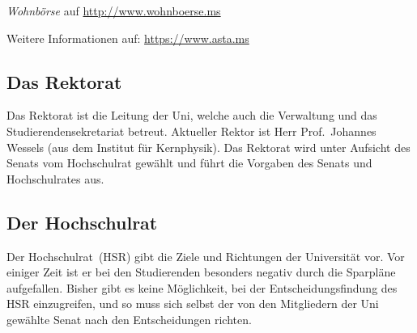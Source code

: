 \begin{multicols*}{2}
\begin{center}
{\begin{minipage}{0.95\columnwidth}
		\textit{Wohnbörse} auf \url{http://www.wohnboerse.ms}
		
		\medskip
		\small
		Weitere Informationen auf: \url{https://www.asta.ms}
	\end{minipage}
	}
\end{center}

\subsection{Das Rektorat}
Das Rektorat ist die Leitung der Uni, welche auch die Verwaltung und das Studierendensekretariat betreut.
Aktueller Rektor ist Herr Prof.\ Johannes Wessels (aus dem Institut für Kernphysik).
Das Rektorat wird unter Aufsicht des Senats vom Hochschulrat gewählt und führt die Vorgaben des Senats und Hochschulrates aus.

\subsection{Der Hochschulrat}
Der Hochschulrat~(HSR) gibt die Ziele und Richtungen der Universität vor.
Vor einiger Zeit ist er bei den Studierenden besonders negativ durch die Sparpläne aufgefallen.
Bisher gibt es keine Möglichkeit, bei der Entscheidungsfindung des HSR einzugreifen, und so muss sich selbst der von den Mitgliedern der Uni gewählte Senat nach den Entscheidungen richten.

\end{multicols*}

